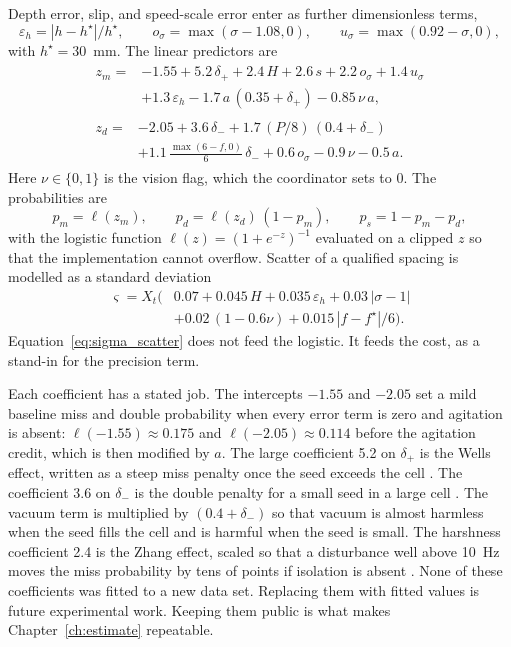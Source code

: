 Depth error, slip, and speed-scale error enter as further dimensionless terms,
\begin{equation}
\varepsilon_h = |h-h^{\star}|/h^{\star},\qquad
o_{\sigma}=\max(\sigma-1.08,0),\qquad
u_{\sigma}=\max(0.92-\sigma,0),
\label{eq:errs}
\end{equation}
with $h^{\star}=30$~mm. The linear predictors are
\begin{align}
\begin{split}
z_m ={}& -1.55 + 5.2\,\delta_{+} + 2.4\,H + 2.6\,s + 2.2\,o_{\sigma} + 1.4\,u_{\sigma} \\
&+ 1.3\,\varepsilon_h - 1.7\,a\,(0.35+\delta_{+}) - 0.85\,\nu\, a,
\end{split} \label{eq:zm}\\
\begin{split}
z_d ={}& -2.05 + 3.6\,\delta_{-} + 1.7\,(P/8)\,(0.4+\delta_{-}) \\
&+ 1.1\,\frac{\max(6-f,0)}{6}\,\delta_{-} + 0.6\,o_{\sigma} - 0.9\,\nu - 0.5\,a.
\end{split} \label{eq:zd}
\end{align}
Here $\nu\in\{0,1\}$ is the vision flag, which the coordinator sets to 0. The probabilities are
\begin{equation}
p_m = \ell(z_m),\qquad
p_d = \ell(z_d)\,(1-p_m),\qquad
p_s = 1-p_m-p_d,
\label{eq:probs}
\end{equation}
with the logistic function $\ell(z)=(1+e^{-z})^{-1}$ evaluated on a clipped $z$ so that the implementation cannot overflow. Scatter of a qualified spacing is modelled as a standard deviation
\begin{equation}
\begin{split}
\varsigma = X_t\Big(&0.07 + 0.045\,H + 0.035\,\varepsilon_h + 0.03\,|\sigma-1| \\
&+ 0.02\,(1-0.6\nu) + 0.015\,|f-f^{\star}|/6\Big).
\end{split}
\label{eq:sigma_scatter}
\end{equation}
Equation~\eqref{eq:sigma_scatter} does not feed the logistic. It feeds the cost, as a stand-in for the precision term.

Each coefficient has a stated job. The intercepts $-1.55$ and $-2.05$ set a mild baseline miss and double probability when every error term is zero and agitation is absent: $\ell(-1.55)\approx 0.175$ and $\ell(-2.05)\approx 0.114$ before the agitation credit, which is then modified by $a$. The large coefficient 5.2 on $\delta_{+}$ is the Wells effect, written as a steep miss penalty once the seed exceeds the cell \cite{wells1990}. The coefficient 3.6 on $\delta_{-}$ is the double penalty for a small seed in a large cell \cite{yazgi2007,onal2012}. The vacuum term is multiplied by $(0.4+\delta_{-})$ so that vacuum is almost harmless when the seed fills the cell and is harmful when the seed is small. The harshness coefficient 2.4 is the Zhang effect, scaled so that a disturbance well above 10~Hz moves the miss probability by tens of points if isolation is absent \cite{zhang2024vib}. None of these coefficients was fitted to a new data set. Replacing them with fitted values is future experimental work. Keeping them public is what makes Chapter~\ref{ch:estimate} repeatable.

